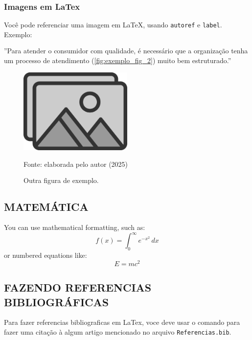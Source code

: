 \subsubsection{Imagens em LaTex}

Você pode referenciar uma imagem em \LaTeX, usando \verb|autoref| e \verb|label|. Exemplo:

''Para atender o consumidor com qualidade, é necessário que a organização tenha um processo de atendimento (\autoref{fig:exemplo_fig_2}) muito bem estruturado.''

\begin{figure}[ht]
    \centering
    \begin{small}
        \caption{Outra figura de exemplo.}
        \includegraphics[width=0.5\textwidth]{Figuras/placeholder_photo.jpg} %
        \label{fig:exemplo_fig_2}
        
        Fonte: elaborada pelo autor (2025)
    \end{small}
\end{figure}

\subsection{MATEMÁTICA}

You can use mathematical formatting, such as:
\[
f(x) = \int_{0}^{\infty} e^{-x^2} \, dx
\]
or numbered equations like:
\begin{equation}
    E = mc^2
\end{equation}

\newpage

\subsection{FAZENDO REFERENCIAS BIBLIOGRÁFICAS}

Para fazer referencias bibliograficas em LaTex, voce deve usar o comando \cite{dirac} para fazer uma citação à algum artigo mencionado no arquivo \texttt{Referencias.bib}.

